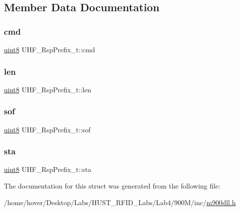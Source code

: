 \subsection{Member Data Documentation}
\mbox{\label{struct_u_h_f___rsp_prefix__t_a459cc328e398139920aa5bcd2116c3ad}} 
\subsubsection{\texorpdfstring{cmd}{cmd}}
{\footnotesize\ttfamily \mbox{\hyperlink{m900dll_8h_adde6aaee8457bee49c2a92621fe22b79}{uint8}} U\+H\+F\+\_\+\+Rsp\+Prefix\+\_\+t\+::cmd}

\mbox{\label{struct_u_h_f___rsp_prefix__t_a6069d1b7c33f96ddeaa9a8a2de64882c}} 
\subsubsection{\texorpdfstring{len}{len}}
{\footnotesize\ttfamily \mbox{\hyperlink{m900dll_8h_adde6aaee8457bee49c2a92621fe22b79}{uint8}} U\+H\+F\+\_\+\+Rsp\+Prefix\+\_\+t\+::len}

\mbox{\label{struct_u_h_f___rsp_prefix__t_a5cb5be4ce05892476e8a719bb63e0525}} 
\subsubsection{\texorpdfstring{sof}{sof}}
{\footnotesize\ttfamily \mbox{\hyperlink{m900dll_8h_adde6aaee8457bee49c2a92621fe22b79}{uint8}} U\+H\+F\+\_\+\+Rsp\+Prefix\+\_\+t\+::sof}

\mbox{\label{struct_u_h_f___rsp_prefix__t_a47a88a572f502bcdeeaa25899b55d8d6}} 
\subsubsection{\texorpdfstring{sta}{sta}}
{\footnotesize\ttfamily \mbox{\hyperlink{m900dll_8h_adde6aaee8457bee49c2a92621fe22b79}{uint8}} U\+H\+F\+\_\+\+Rsp\+Prefix\+\_\+t\+::sta}



The documentation for this struct was generated from the following file\+:\begin{DoxyCompactItemize}
\item 
/home/hover/\+Desktop/\+Labs/\+H\+U\+S\+T\+\_\+\+R\+F\+I\+D\+\_\+\+Labs/\+Lab4/900\+M/inc/\mbox{\hyperlink{m900dll_8h}{m900dll.\+h}}\end{DoxyCompactItemize}

